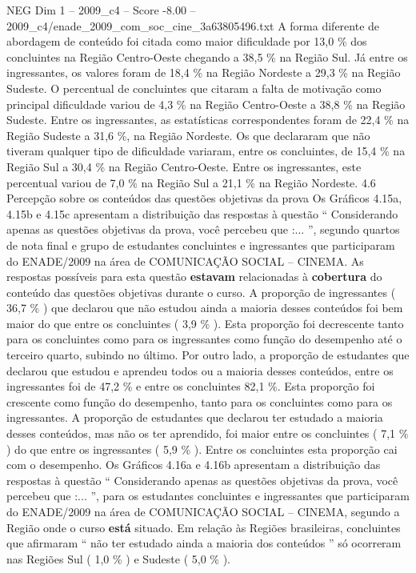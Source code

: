 \begin{textsample}{NEG Dim 1 – 2009\_c4 – Score -8.00 – 2009\_c4/enade\_2009\_com\_soc\_cine\_3a63805496.txt}
A forma diferente de abordagem de conteúdo foi citada como maior dificuldade por 13,0 \% dos concluintes na Região Centro-Oeste chegando a 38,5 \% na Região Sul.
Já entre os ingressantes, os valores foram de 18,4 \% na Região Nordeste a 29,3 \% na Região Sudeste.
O percentual de concluintes que citaram a falta de motivação como principal dificuldade variou de 4,3 \% na Região Centro-Oeste a 38,8 \% na Região Sudeste.
Entre os ingressantes, as estatísticas correspondentes foram de 22,4 \% na Região Sudeste a 31,6 \%, na Região Nordeste.
Os que declararam que não tiveram qualquer tipo de dificuldade variaram, entre os concluintes, de 15,4 \% na Região Sul a 30,4 \% na Região Centro-Oeste.
Entre os ingressantes, este percentual variou de 7,0 \% na Região Sul a 21,1 \% na Região Nordeste. 4.6 Percepção sobre os conteúdos das questões objetivas da prova Os Gráficos 4.15a, 4.15b e 4.15c apresentam a distribuição das respostas à questão “ Considerando apenas as questões objetivas da prova, você percebeu que :... ”, segundo quartos de nota final e grupo de estudantes concluintes e ingressantes que participaram do ENADE/2009 na área de COMUNICAÇÃO SOCIAL – CINEMA.
As respostas possíveis para esta questão \textbf{estavam} relacionadas à \textbf{cobertura} do conteúdo das questões objetivas durante o curso.
A proporção de ingressantes ( 36,7 \% ) que declarou que não estudou ainda a maioria desses conteúdos foi bem maior do que entre os concluintes ( 3,9 \% ).
Esta proporção foi decrescente tanto para os concluintes como para os ingressantes como função do desempenho até o terceiro quarto, subindo no último.
Por outro lado, a proporção de estudantes que declarou que estudou e aprendeu todos ou a maioria desses conteúdos, entre os ingressantes foi de 47,2 \% e entre os concluintes 82,1 \%.
Esta proporção foi crescente como função do desempenho, tanto para os concluintes como para os ingressantes.
A proporção de estudantes que declarou ter estudado a maioria desses conteúdos, mas não os ter aprendido, foi maior entre os concluintes ( 7,1 \% ) do que entre os ingressantes ( 5,9 \% ).
Entre os concluintes esta proporção cai com o desempenho.
Os Gráficos 4.16a e 4.16b apresentam a distribuição das respostas à questão “ Considerando apenas as questões objetivas da prova, você percebeu que :... ”, para os estudantes concluintes e ingressantes que participaram do ENADE/2009 na área de COMUNICAÇÃO SOCIAL – CINEMA, segundo a Região onde o curso \textbf{está} situado.
Em relação às Regiões brasileiras, concluintes que afirmaram “ não ter estudado ainda a maioria dos conteúdos ” só ocorreram nas Regiões Sul ( 1,0 \% ) e Sudeste ( 5,0 \% ).

\end{textsample}
